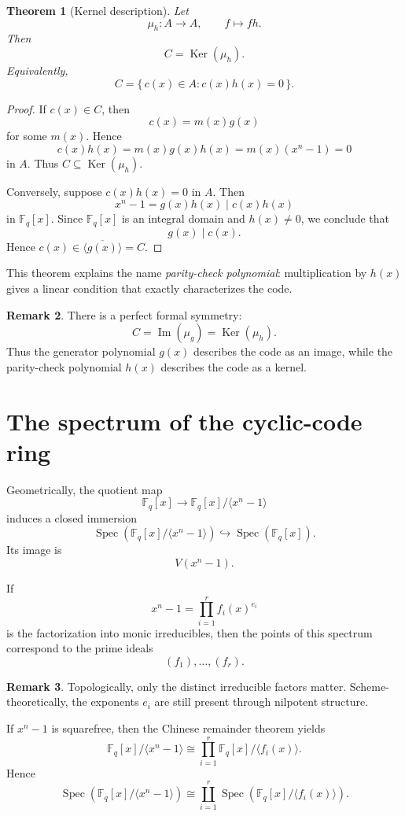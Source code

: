 \documentclass[11pt]{article}
\newtheorem{theorem}{Theorem}[section]
\theoremstyle{definition}
\newtheorem{remark}[theorem]{Remark}
\newcommand{\F}{\mathbb{F}}
\newcommand{\Spec}{\operatorname{Spec}}
\newcommand{\im}{\operatorname{Im}}
\newcommand{\Ker}{\operatorname{Ker}}
\newcommand{\ideal}[1]{\langle #1\rangle}
\newcommand{\ol}[1]{\overline{#1}}
\begin{document}
	\begin{theorem}[Kernel description]\label{thm:parity-check}
		Let
		\[
		\mu_h:A\longrightarrow A,
		\qquad
		f\longmapsto fh.
		\]
		Then
		\[
		C=\Ker(\mu_h).
		\]
		Equivalently,
		\[
		C=\{\,c(x)\in A : c(x)h(x)=0\,\}.
		\]
	\end{theorem}
	
	\begin{proof}
		If $c(x)\in C$, then
		\[
		c(x)=m(x)g(x)
		\]
		for some $m(x)$. Hence
		\[
		c(x)h(x)=m(x)g(x)h(x)=m(x)(x^n-1)=0
		\]
		in $A$. Thus $C\subseteq \Ker(\mu_h)$.
		
		Conversely, suppose $c(x)h(x)=0$ in $A$. Then
		\[
		x^n-1=g(x)h(x)\mid c(x)h(x)
		\]
		in $\F_q[x]$. Since $\F_q[x]$ is an integral domain and $h(x)\neq 0$, we conclude that
		\[
		g(x)\mid c(x).
		\]
		Hence $c(x)\in \ideal{\ol{g(x)}}=C$.
	\end{proof}
	
	This theorem explains the name \emph{parity-check polynomial}: multiplication by $h(x)$ gives a linear condition that exactly characterizes the code.
	
	\begin{remark}
		There is a perfect formal symmetry:
		\[
		C=\im(\mu_g)=\Ker(\mu_h).
		\]
		Thus the generator polynomial $g(x)$ describes the code as an image, while the parity-check polynomial $h(x)$ describes the code as a kernel.
	\end{remark}
	
	\section{The spectrum of the cyclic-code ring}
	
	Geometrically, the quotient map
	\[
	\F_q[x]\longrightarrow \F_q[x]/\ideal{x^n-1}
	\]
	induces a closed immersion
	\[
	\Spec\!\left(\F_q[x]/\ideal{x^n-1}\right)
	\hookrightarrow
	\Spec(\F_q[x]).
	\]
	Its image is
	\[
	V(x^n-1).
	\]
	
	If
	\[
	x^n-1=\prod_{i=1}^r f_i(x)^{e_i}
	\]
	is the factorization into monic irreducibles, then the points of this spectrum correspond to the prime ideals
	\[
	(f_1),\dots,(f_r).
	\]
	
	\begin{remark}
		Topologically, only the distinct irreducible factors matter.  
		Scheme-theoretically, the exponents $e_i$ are still present through nilpotent structure.
	\end{remark}
	
	If $x^n-1$ is squarefree, then the Chinese remainder theorem yields
	\[
	\F_q[x]/\ideal{x^n-1}
	\cong
	\prod_{i=1}^r \F_q[x]/\ideal{f_i(x)}.
	\]
	Hence
	\[
	\Spec\!\left(\F_q[x]/\ideal{x^n-1}\right)
	\cong
	\coprod_{i=1}^r \Spec\!\left(\F_q[x]/\ideal{f_i(x)}\right).
	\]
	
\end{document}

